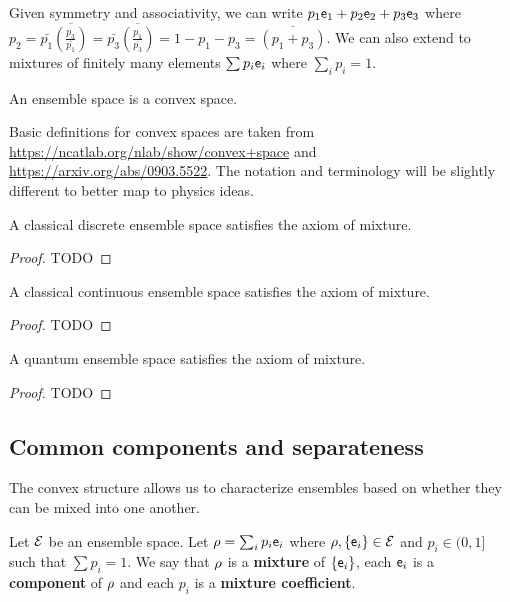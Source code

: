 \begin{remark}
	Given symmetry and associativity, we can write $p_1 \ens_1 + p_2 \ens_2 + p_3 \ens_3$ where $p_2 = \bar{p_1}\overline{\left(\frac{p_3}{\bar{p_1}}\right)} = \bar{p_3}\overline{\left(\frac{p_1}{\bar{p_3}}\right)} = 1 - p_1 - p_3 = \overline{\left(p_1 + p_3\right)}$. We can also extend to mixtures of finitely many elements $\sum p_i \ens_i$ where $\sum_i p_i = 1$.
\end{remark}

\begin{coro}
	An ensemble space is a convex space.
\end{coro}

\begin{remark}
	Basic definitions for convex spaces are taken from \url{https://ncatlab.org/nlab/show/convex+space} and \url{https://arxiv.org/abs/0903.5522}. The notation and terminology will be slightly different to better map to physics ideas. 
\end{remark}

\begin{prop}
	A classical discrete ensemble space satisfies the axiom of mixture.
\end{prop}

\begin{proof}
	TODO
\end{proof}

\begin{prop}
	A classical continuous ensemble space satisfies the axiom of mixture.
\end{prop}

\begin{proof}
	TODO
\end{proof}

\begin{prop}
	A quantum ensemble space satisfies the axiom of mixture.
\end{prop}

\begin{proof}
	TODO
\end{proof}

\subsection{Common components and separateness}

The convex structure allows us to characterize ensembles based on whether they can be mixed into one another.

\begin{defn}
	Let $\Ens$ be an ensemble space. Let $\ens[\rho] = \sum_i p_i \ens_i$ where $\ens[\rho], \{\ens_i\} \in \Ens$ and $p_i \in (0,1]$ such that $\sum p_i = 1$. We say that $\ens[\rho]$ is a \textbf{mixture} of $\{\ens_i\}$, each $\ens_i$ is a \textbf{component} of $\ens[\rho]$ and each $p_i$ is a \textbf{mixture coefficient}.
\end{defn}

